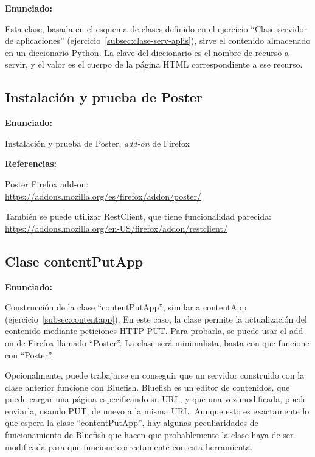 \textbf{Enunciado:}

Esta clase, basada en el esquema de clases definido en el ejercicio ``Clase servidor de aplicaciones'' (ejercicio~\ref{subsec:clase-serv-aplis}), sirve el contenido almacenado en un diccionario Python. La clave del diccionario es el nombre de recurso a servir, y el valor es el cuerpo de la página HTML correspondiente a ese recurso.

\subsection{Instalación y prueba de Poster}
\label{subsec:inst-poster}

\textbf{Enunciado:}

Instalación y prueba de Poster, \emph{add-on} de Firefox

\textbf{Referencias:}

Poster Firefox add-on: \\
\url{https://addons.mozilla.org/es/firefox/addon/poster/}

También se puede utilizar RestClient, que tiene funcionalidad parecida: \\
\url{https://addons.mozilla.org/en-US/firefox/addon/restclient/}

\subsection{Clase contentPutApp}
\label{subsec:contentputapp}

\textbf{Enunciado:}

Construcción de la clase ``contentPutApp'', similar a contentApp (ejercicio~\ref{subsec:contentapp}). En este caso, la clase permite la actualización del contenido mediante peticiones HTTP PUT. Para probarla, se puede usar el add-on de Firefox llamado ``Poster''. La clase será minimalista, basta con que funcione con ``Poster''.

Opcionalmente, puede trabajarse en conseguir que un servidor construido con la clase anterior funcione con Bluefish. Bluefish es un editor de contenidos, que puede cargar una página especificando su URL, y que una vez modificada, puede enviarla, usando PUT, de nuevo a la misma URL. Aunque esto es exactamente lo que espera la clase ``contentPutApp'', hay algunas peculiaridades de funcionamiento de Bluefish que hacen que probablemente la clase haya de ser modificada para que funcione correctamente con esta herramienta.

